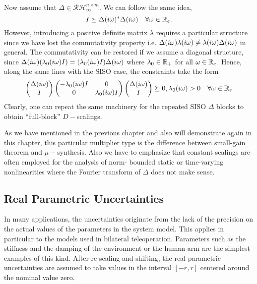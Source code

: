 Now assume that $\Delta\in\mathcal{RH}^{n\times m}_\infty$. We can follow the same idea, 
\[
I\succeq \Delta(i\omega)^*\Delta(i\omega) \quad \forall\omega\in\mathbb{R}_e.
\]
However, introducing a positive definite matrix $\lambda$ requires a particular structure
since we have lost the commutativity property i.e. $\Delta(i\omega)\lambda(i\omega) \neq \lambda(i\omega)
\Delta(i\omega)$ in general. The commutativity can be restored if we assume a diagonal structure,
since $\Delta(i\omega)(\lambda_0(i\omega)I) = (\lambda_0(i\omega)I)\Delta(i\omega)$ where $\lambda_0\in\mathbb{R}_+$
for all $\omega\in\mathbb{R}_e$. Hence, along the same lines with the SISO case, the constraints 
take the form 
\[
\begin{pmatrix}\Delta(i\omega) \\ I\end{pmatrix}\begin{pmatrix}-\lambda_0(i\omega)I &0\\0 &\lambda_0(i\omega)I\end{pmatrix}\begin{pmatrix}\Delta(i\omega) \\ I\end{pmatrix}
\succeq 0, \lambda_0(i\omega)>0 \quad \forall \omega\in\mathbb{R}_e 
\]
Clearly, one can repeat the same machinery for the repeated SISO $\Delta$ blocks to obtain 
``full-block'' $D-$scalings. 

As we have mentioned in the previous chapter and also will demonstrate again in this chapter, 
this particular multiplier type is the difference between small-gain theorem and $\mu-$synthesis.
Also we have to emphasize that constant scalings are often employed for the analysis of norm-%
bounded static or time-varying nonlinearities where the Fourier transform of $\Delta$ does not 
make sense. 



\subsection{Real Parametric Uncertainties}\label{sec:ltvenv}
In many applications, the uncertainties originate from the lack of the precision
on the actual values of the parameters in the system model. This applies in
particular to the models used in bilateral teleoperation. Parameters such as the
stiffness and the damping of the environment or the human arm are the simplest
examples of this kind. After re-scaling and shifting, the real parametric uncertainties
are assumed to take values in the interval $\left[ -r,r \right]$ centered around
the nominal value zero.


